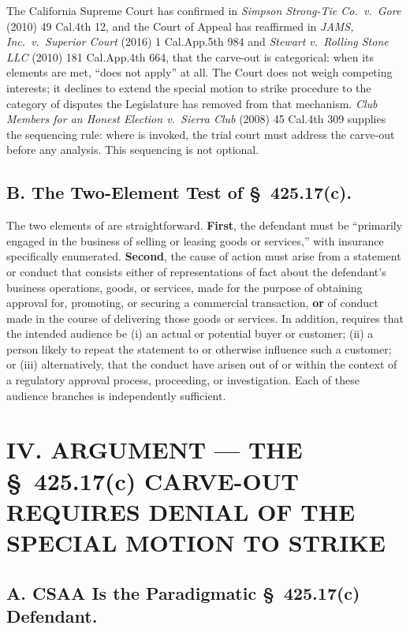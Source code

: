 The California Supreme Court has confirmed in \textit{Simpson Strong-Tie Co.\ v.\ Gore} (2010) 49 Cal.4th 12, and the Court of Appeal has reaffirmed in \textit{JAMS, Inc.\ v.\ Superior Court} (2016) 1 Cal.App.5th 984 and \textit{Stewart v.\ Rolling Stone LLC} (2010) 181 Cal.App.4th 664, that the carve-out is categorical: when its elements are met,  ``does not apply'' at all. The Court does not weigh competing interests; it declines to extend the special motion to strike procedure to the category of disputes the Legislature has removed from that mechanism. \textit{Club Members for an Honest Election v.\ Sierra Club} (2008) 45 Cal.4th 309 supplies the sequencing rule: where  is invoked, the trial court must address the carve-out before any  analysis. This sequencing is not optional.

\subsection*{B. The Two-Element Test of \S~425.17(c).}

The two elements of  are straightforward. \textbf{First}, the defendant must be ``primarily engaged in the business of selling or leasing goods or services,'' with insurance specifically enumerated. \textbf{Second}, the cause of action must arise from a statement or conduct that consists either of representations of fact about the defendant's business operations, goods, or services, made for the purpose of obtaining approval for, promoting, or securing a commercial transaction, \textbf{or} of conduct made in the course of delivering those goods or services. In addition,  requires that the intended audience be (i) an actual or potential buyer or customer; (ii) a person likely to repeat the statement to or otherwise influence such a customer; or (iii) alternatively, that the conduct have arisen out of or within the context of a regulatory approval process, proceeding, or investigation. Each of these audience branches is independently sufficient.

\section*{IV. ARGUMENT --- THE \S~425.17(c) CARVE-OUT REQUIRES DENIAL OF THE SPECIAL MOTION TO STRIKE}

\subsection*{A. CSAA Is the Paradigmatic \S~425.17(c) Defendant.}

